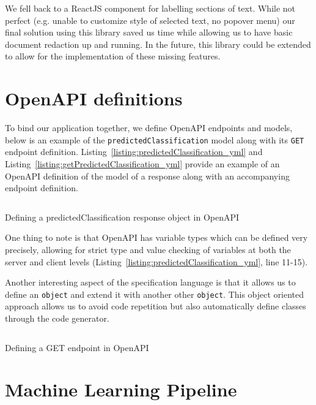 \documentclass[\version]{l4proj}
\newenvironment{longlisting}{\captionsetup{type=listing}\vspace{10pt}}{}
\begin{document}
We fell back to \textcite{camachoMcamacReacttextannotate2020} a ReactJS component for labelling sections of text.
While not perfect (e.g. unable to customize style of selected text, no popover menu) our final solution using this library saved us time while allowing us to have basic document redaction up and running.
In the future, this library could be extended to allow for the implementation of these missing features.

\section{OpenAPI definitions}

To bind our application together, we define OpenAPI endpoints and models, below is an example of the \verb|predictedClassification| model along with its \verb|GET| endpoint definition.
Listing~\ref{listing:predictedClassification_yml} and Listing~\ref{listing:getPredictedClassification_yml} provide an example of an OpenAPI definition of the model of a response along with an accompanying endpoint definition.

\begin{listing}[H]
    \inputminted{yaml}{code/predictedClassification.yml}
    \caption{Defining a predictedClassification response object in OpenAPI}\label{listing:predictedClassification_yml}
\end{listing}

One thing to note is that OpenAPI has variable types which can be defined very precisely, allowing for strict type and value checking of variables at both the server and client levels (Listing~\ref{listing:predictedClassification_yml}, line 11-15).

Another interesting aspect of the specification language is that it allows us to define an \verb|object| and extend it with another other \verb|object|.
This object oriented approach allows us to avoid code repetition but also automatically define classes through the code generator.

\begin{longlisting}
    \inputminted{yaml}{code/getPredictedClassification.yml}
    \caption{Defining a GET endpoint in OpenAPI}\label{listing:getPredictedClassification_yml}
\end{longlisting}

\section{Machine Learning Pipeline}
\end{document}

